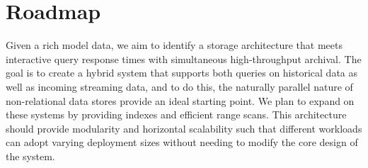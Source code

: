 \documentclass[11pt]{article}
\begin{document}
\section{Roadmap}



Given a rich model data, we aim to identify a storage architecture that meets
interactive query response times with simultaneous high-throughput archival.
The goal is to create a hybrid system that supports both queries on
historical data as well as incoming streaming data, and to do this, the
naturally parallel nature of non-relational data stores provide an ideal
starting point. We plan to expand on these systems by providing indexes and
efficient range scans. This architecture should provide modularity and
horizontal scalability such that different workloads can adopt varying
deployment sizes without needing to modify the core design of the system.
\end{document}
